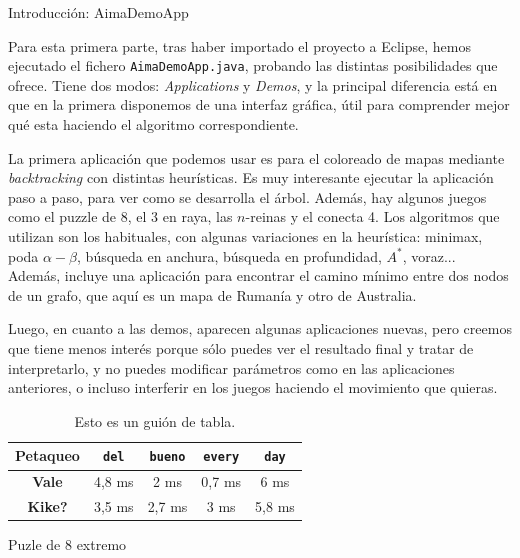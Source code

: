 \documentclass[11pt, a4paper, spanish, openright, twoside]{book}
\begin{document}
\begin{section}{Introducción: AimaDemoApp}

Para esta primera parte, tras haber importado el proyecto a Eclipse, hemos ejecutado el fichero \texttt{AimaDemoApp.java}, probando las distintas posibilidades que ofrece. Tiene dos modos: \textit{Applications} y \textit{Demos}, y la principal diferencia está en que en la primera disponemos de una interfaz gráfica, útil para comprender mejor qué esta haciendo el algoritmo correspondiente. 

La primera aplicación que podemos usar es para el coloreado de mapas mediante \textit{backtracking} con distintas heurísticas. Es muy interesante ejecutar la aplicación paso a paso, para ver como se desarrolla el árbol. Además, hay algunos juegos como el puzzle de 8, el 3 en raya, las $n$-reinas y el conecta 4. Los algoritmos que utilizan son los habituales, con algunas variaciones en la heurística: minimax, poda $\alpha-\beta$, búsqueda en anchura, búsqueda en profundidad, $A^*$, voraz... Además, incluye una aplicación para encontrar el camino mínimo entre dos nodos de un grafo, que aquí es un mapa de Rumanía y otro de Australia. %

Luego, en cuanto a las demos, aparecen algunas aplicaciones nuevas, pero creemos que tiene menos interés porque sólo puedes ver el resultado final y tratar de interpretarlo, y no puedes modificar parámetros como en las aplicaciones anteriores, o incluso interferir en los juegos haciendo el movimiento que quieras. 

	\begin{table}	
		\begin{center}
			\begin{tabular}{|c||c|c|c|c|}
				\hline	Petaqueo	& \texttt{del} 	& \texttt{bueno} 	& \texttt{every} & \texttt{day}\\ \hline \hline
				\textbf{Vale} 	&  	4,8 ms	& 	2 ms	 & 	0,7 ms		& 6 ms	  \\ \hline 
				\textbf{Kike?}  	&  	3,5 ms	& 	2,7 ms	 & 	3 ms		& 5,8 ms	 \\ \hline 				
			\end{tabular}
		\caption{Esto es un guión de tabla.}
		\end{center}
	\end{table}

\end{section}

\begin{section}{Puzle de 8 extremo}

	
\end{section}
\end{document}
